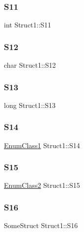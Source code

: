 \subsubsection{\texorpdfstring{S11}{S11}}
{\footnotesize\ttfamily int Struct1\+::\+S11}

\mbox{\label{structStruct1_ab5b5ef0442d62f260d3231bfe93f4d3d}} 
\subsubsection{\texorpdfstring{S12}{S12}}
{\footnotesize\ttfamily char Struct1\+::\+S12}

\mbox{\label{structStruct1_a2cfde9a801e79d5c1589c5861b52400f}} 
\subsubsection{\texorpdfstring{S13}{S13}}
{\footnotesize\ttfamily long Struct1\+::\+S13}

\mbox{\label{structStruct1_afddb16c0b88164bd8aa20988ed456111}} 
\subsubsection{\texorpdfstring{S14}{S14}}
{\footnotesize\ttfamily \hyperlink{ParsedC_8h_a542930d5f2f117ff1e21206f2baa51c5}{Enum\+Class1} Struct1\+::\+S14}

\mbox{\label{structStruct1_ae2f5a2f538ffd72951049d7f1a823c37}} 
\subsubsection{\texorpdfstring{S15}{S15}}
{\footnotesize\ttfamily \hyperlink{ParsedC_8h_a51df612b239afb50004d7a39b20a5745}{Enum\+Class2} Struct1\+::\+S15}

\mbox{\label{structStruct1_a3b6b2444b54b42fe87aedcada8bfecfb}} 
\subsubsection{\texorpdfstring{S16}{S16}}
{\footnotesize\ttfamily Some\+Struct Struct1\+::\+S16}

